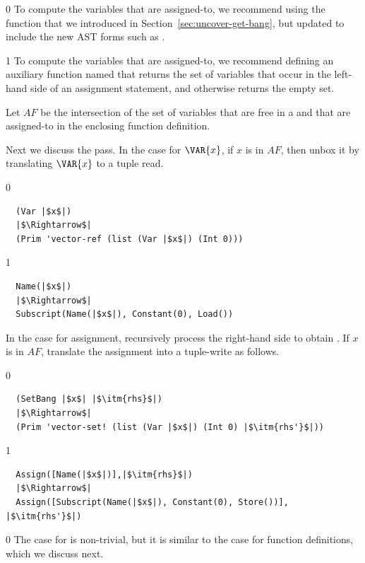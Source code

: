 \documentclass[7x10,nocrop]{TimesAPriori_MIT}%
\def\racketEd{0}
\def\pythonEd{1}
\def\edition{0}
\begin{document}
{\if\edition\racketEd
%
To compute the variables that are assigned-to, we recommend using the
 function that we introduced in
Section~\ref{sec:uncover-get-bang}, but updated to include the new AST
forms such as .
%
\fi}
  
{\if\edition\pythonEd
%
To compute the variables that are assigned-to, we recommend defining
an auxiliary function named  that returns
the set of variables that occur in the left-hand side of an assignment
statement, and otherwise returns the empty set.
%
\fi}

Let $\mathit{AF}$ be the intersection of the set of variables that are
free in a  and that are assigned-to in the enclosing
function definition.

Next we discuss the  pass.  In the case for
$\VAR{x}$, if $x$ is in $\mathit{AF}$, then unbox it by translating
$\VAR{x}$ to a tuple read.
%
{\if\edition\racketEd
\begin{lstlisting}
  (Var |$x$|)
  |$\Rightarrow$|
  (Prim 'vector-ref (list (Var |$x$|) (Int 0)))
\end{lstlisting}
\fi}
%
{\if\edition\pythonEd
\begin{lstlisting}
  Name(|$x$|)
  |$\Rightarrow$|
  Subscript(Name(|$x$|), Constant(0), Load())
\end{lstlisting}
\fi}
%
%
In the case for assignment, recursively process the right-hand side
 to obtain .  If $x$ is in $\mathit{AF}$, translate
the assignment into a tuple-write as follows.
%
{\if\edition\racketEd
\begin{lstlisting}
  (SetBang |$x$| |$\itm{rhs}$|)
  |$\Rightarrow$|
  (Prim 'vector-set! (list (Var |$x$|) (Int 0) |$\itm{rhs'}$|))
\end{lstlisting}
\fi}
{\if\edition\pythonEd
\begin{lstlisting}
  Assign([Name(|$x$|)],|$\itm{rhs}$|)
  |$\Rightarrow$|
  Assign([Subscript(Name(|$x$|), Constant(0), Store())], |$\itm{rhs'}$|)
\end{lstlisting}
\fi}
%
{\if\edition\racketEd
The case for  is non-trivial, but it is similar to the
case for function definitions, which we discuss next.
\fi}
\end{document}
